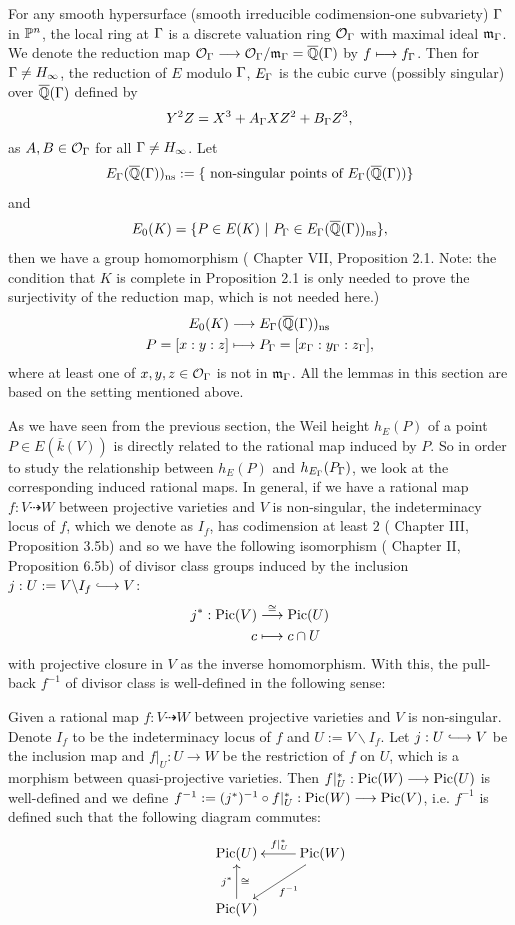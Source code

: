 \documentclass[12pt,reqno]{amsart}
\begin{document}
For any smooth hypersurface (smooth irreducible codimension-one subvariety) $\Gamma$ in $\mathbb{P}^n$, the local ring at $\Gamma$ is a discrete valuation ring ${\mathcal O}_\Gamma$ with maximal ideal $\frak{m}_\Gamma$. We denote the reduction map ${\mathcal O}_\Gamma \longrightarrow {\mathcal O}_\Gamma/\frak{m}_\Gamma= \overline{\mathbb{Q}}(\Gamma)$ by $f \longmapsto f_\Gamma$. Then for $\Gamma \neq H_\infty$, the reduction of $E$ modulo $\Gamma$, $E_\Gamma$ is the cubic curve (possibly singular) over $\overline{\mathbb{Q}}(\Gamma)$ defined by 
$$Y^2Z=X^3+A_\Gamma XZ^2+B_\Gamma Z^3,$$ as $A,B \in {\mathcal O}_\Gamma$ for all $\Gamma \neq H_\infty$. Let 
$$E_\Gamma(\overline{\mathbb{Q}}(\Gamma))_{\text{ns}}:=\{ \text{ non-singular points of }E_\Gamma(\overline{\mathbb{Q}}(\Gamma))\} $$ and
$$E_0(K)=\{ P \in E(K) \ | \ P_\Gamma \in E_\Gamma(\overline{\mathbb{Q}}(\Gamma))_{\text{ns}}\}, $$
then we have a group homomorphism (\cite{SAE} Chapter VII, Proposition 2.1. Note: the condition that $K$ is complete in Proposition 2.1 is only needed to prove the surjectivity of the reduction map, which is not needed here.)
\begin{align*}
E_0(K) &\longrightarrow E_\Gamma(\overline{\mathbb{Q}}(\Gamma))_{\text{ns}} \\
P=[x:y:z] &\longmapsto P_\Gamma=[x_\Gamma: y_\Gamma: z_\Gamma],
\end{align*} where at least one of $x,y,z \in {\mathcal O}_\Gamma$ is not in $\frak{m}_\Gamma$. All the lemmas in this section are based on the setting mentioned above.

As we have seen from the previous section, the Weil height $h_E(P)$ of a point $P\in E(\overline{k}(V))$ is directly related to the rational map induced by $P$. So in order to study the relationship between $h_{E}(P)$ and $h_{E_\Gamma}(P_\Gamma)$, we look at the corresponding induced rational maps. In general, if we have a rational map $f : V \dashrightarrow W$ between projective varieties and $V$ is non-singular, the indeterminacy locus of $f$, which we denote as $I_f$, has codimension at least $2$ (\cite{SAT} Chapter III, Proposition 3.5b) and so we have the following isomorphism (\cite{HAG} Chapter II, Proposition 6.5b) of divisor class groups induced by the inclusion $j:U:= V\backslash I_f \longhookrightarrow V$:
\begin{align*}
j^*: \operatorname{Pic}(V) &\stackrel{\cong}{\longrightarrow} \operatorname{Pic}(U)\\
c &\longmapsto  c \cap U
\end{align*}with projective closure in $V$ as the inverse homomorphism. With this, the pull-back $f^{-1}$ of divisor class is well-defined in the following sense:

\begin{definition} Given a rational map $f : V \dashrightarrow W$ between projective varieties and $V$ is non-singular. Denote $I_f$ to be the indeterminacy locus of $f$ and $U:= V\backslash I_f$. Let $j: U \longhookrightarrow V$ be the inclusion map and $f|_{U}:U\longrightarrow W$ be the restriction of $f$ on $U$, which is a morphism between quasi-projective varieties. Then $f|_{U}^* : \operatorname{Pic}(W)  \longrightarrow \operatorname{Pic}(U)$ is well-defined and we define $f^{-1}:=(j^*)^{-1} \circ f|_{U}^* : \operatorname{Pic}(W) \longrightarrow \operatorname{Pic}(V)$, i.e. $f^{-1}$ is defined such that the following diagram commutes:
$$\xymatrix{
&\Pic(U)  
&\Pic(W) \ar@{->}[l]_{f|_{U}^*} \ar@{->}[dl]^{f^{-1}} \\
&\Pic(V)  \ar@{->}[u]^{j^*}_\cong 
}$$
\end{definition}
\end{document}
